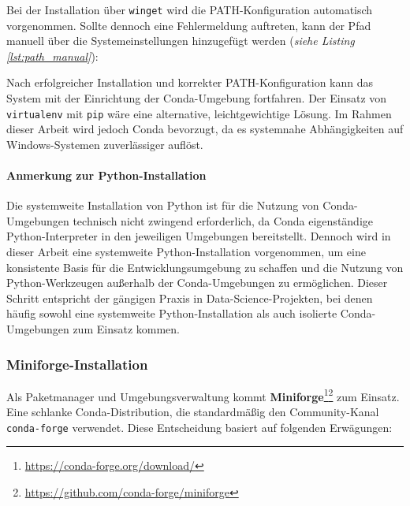 

Bei der Installation über \texttt{\acs{winget}} wird die PATH-Konfiguration automatisch vorgenommen. Sollte dennoch eine Fehlermeldung auftreten, kann der Pfad manuell über die Systemeinstellungen hinzugefügt werden (\textit{siehe Listing \ref{lst:path_manual}}):



Nach erfolgreicher Installation und korrekter PATH-Konfiguration kann das System mit der Einrichtung der Conda-Umgebung fortfahren. Der Einsatz von \texttt{\acs{virtualenv}} mit \texttt{\acs{pip}} wäre eine alternative, leichtgewichtige Lösung. Im Rahmen dieser Arbeit wird jedoch Conda bevorzugt, da es systemnahe Abhängigkeiten auf Windows-Systemen zuverlässiger auflöst.

\paragraph{\textbf{Anmerkung zur Python-Installation}}

Die systemweite Installation von Python ist für die Nutzung von Conda-Umgebungen technisch nicht zwingend erforderlich, da Conda eigenständige Python-Interpreter in den jeweiligen Umgebungen bereitstellt. Dennoch wird in dieser Arbeit eine systemweite Python-Installation vorgenommen, um eine konsistente Basis für die Entwicklungsumgebung zu schaffen und die Nutzung von Python-Werkzeugen außerhalb der Conda-Umgebungen zu ermöglichen. Dieser Schritt entspricht der gängigen Praxis in Data-Science-Projekten, bei denen häufig sowohl eine systemweite Python-Installation als auch isolierte Conda-Umgebungen zum Einsatz kommen.

\subsubsection{Miniforge-Installation}

Als Paketmanager und Umgebungsverwaltung kommt \textbf{Miniforge}\footnote{\url{https://conda-forge.org/download/}}\footnote{\url{https://github.com/conda-forge/miniforge}} zum Einsatz. Eine schlanke Conda-Distribution, die standardmäßig den Community-Kanal \texttt{conda-forge} verwendet. Diese Entscheidung basiert auf folgenden Erwägungen:

